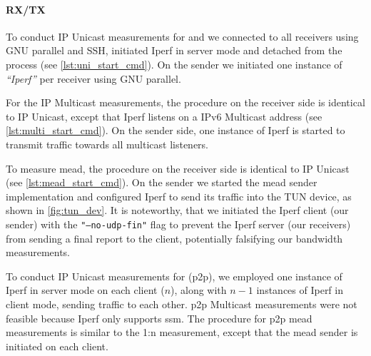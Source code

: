 \paragraph{RX/TX} %
\label{par:RX/TX}
To conduct IP Unicast measurements for \uci{} and \ucii{} we connected to all
    receivers using GNU parallel and SSH, initiated Iperf in server mode and
    detached from the process (see \autoref{lst:uni_start_cmd}).
On the sender we initiated one instance of \textit{``Iperf''} per receiver using GNU
    parallel.

For the IP Multicast measurements, the procedure on the receiver side is
    identical to IP Unicast, except that Iperf listens on a IPv6 Multicast
    address (see \autoref{lst:multi_start_cmd}).
On the sender side, one instance of Iperf is started to transmit traffic
    towards all multicast listeners.

To measure \gls{mead}, the procedure on the receiver side is identical to IP
    Unicast (see \autoref{lst:mead_start_cmd}).
On the sender we started the \gls{mead} sender implementation and configured
    Iperf to send its traffic into the TUN device, as shown in
    \autoref{fig:tun_dev}.
It is noteworthy, that we initiated the Iperf client (our sender) with the
    \texttt{"--no-udp-fin"} flag to prevent the Iperf server (our receivers)
    from sending a final report to the client, potentially falsifying our
    bandwidth measurements.

To conduct IP Unicast measurements for \uciii{} (\gls{p2p}), we employed one
    instance of Iperf in server mode on each client ($n$), along with $n-1$
    instances of Iperf in client mode, sending traffic to each other.
\gls{p2p} Multicast measurements were not feasible because Iperf only supports
    \gls{ssm}.
The procedure for \gls{p2p} \gls{mead} measurements is similar to the 1:n
    measurement, except that the \gls{mead} sender is initiated on each client.

